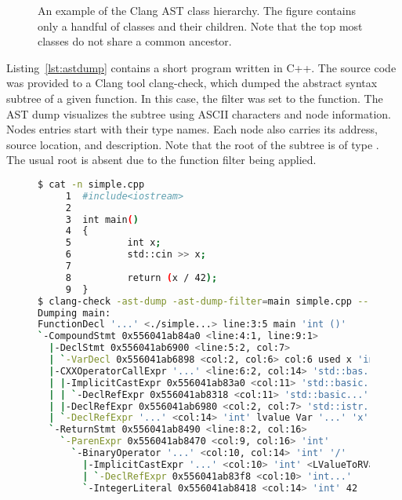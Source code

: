 \begin{figure}[ht]
\caption{An example of the Clang AST class hierarchy. 
The figure contains only a handful of classes and their children.
Note that the top most classes do not share a common ancestor.}
\label{dia:ast}
\end{figure}

Listing~\ref{lst:astdump} contains a short program written in C++.
The source code was provided to a Clang tool clang-check, which
dumped the abstract syntax subtree of a given function.
In this case, the filter was set to the  function.
The AST dump visualizes the subtree using ASCII characters
and node information.
Nodes entries start with their type names. 
Each node also carries its address, source location, and description.
Note that the root of the subtree is of type .
The usual root  is absent due to the function
filter being applied.

\begin{figure}[ht]\centering
\begin{lstlisting}[caption=Clang AST Dump., language=bash, 
label={lst:astdump}, basicstyle=\small, numbers=none]
$ cat -n simple.cpp
     1  #include<iostream>
     2
     3  int main()
     4  {
     5          int x;
     6          std::cin >> x;
     7
     8          return (x / 42);
     9  } 
$ clang-check -ast-dump -ast-dump-filter=main simple.cpp --
Dumping main:
FunctionDecl '...' <./simple...> line:3:5 main 'int ()'
`-CompoundStmt 0x556041ab84a0 <line:4:1, line:9:1>
  |-DeclStmt 0x556041ab6900 <line:5:2, col:7>
  | `-VarDecl 0x556041ab6898 <col:2, col:6> col:6 used x 'int'
  |-CXXOperatorCallExpr '...' <line:6:2, col:14> 'std::bas...'
  | |-ImplicitCastExpr 0x556041ab83a0 <col:11> 'std::basic...'
  | | `-DeclRefExpr 0x556041ab8318 <col:11> 'std::basic...'
  | |-DeclRefExpr 0x556041ab6980 <col:2, col:7> 'std::istr...'
  | `-DeclRefExpr '...' <col:14> 'int' lvalue Var '...' 'x'
  `-ReturnStmt 0x556041ab8490 <line:8:2, col:16>
    `-ParenExpr 0x556041ab8470 <col:9, col:16> 'int'
      `-BinaryOperator '...' <col:10, col:14> 'int' '/'
        |-ImplicitCastExpr '...' <col:10> 'int' <LValueToRValue>
        | `-DeclRefExpr 0x556041ab83f8 <col:10> 'int...'
        `-IntegerLiteral 0x556041ab8418 <col:14> 'int' 42
\end{lstlisting}
\end{figure}

